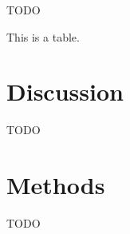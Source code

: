 \documentclass[a4paper,10pt,abstracton]{scrartcl}
\begin{document}
TODO

\begin{table}[h]
  \centering
  
  \caption{This is a table.}
  \label{table:demo}
\end{table}

\section*{Discussion}

TODO

\section*{Methods}

TODO
\end{document}

